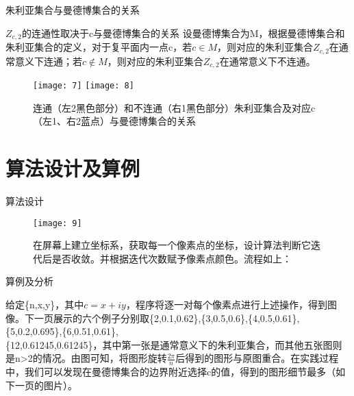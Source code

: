 \documentclass[serif]{beamer}
\begin{document}
\begin{frame}{朱利亚集合与曼德博集合的关系}

\begin{block}{$Z_{c,2}$的连通性取决于c与曼德博集合的关系}
设曼德博集合为M，根据曼德博集合和朱利亚集合的定义，对于复平面内一点c，若$c\in M$，则对应的朱利亚集合$Z_{c,2}$在通常意义下连通；若$c\notin M$，则对应的朱利亚集合$Z_{c,2}$在通常意义下不连通。\cite{TheJuliaSet}

\begin{figure}
\texttt{[image: 7]}
\texttt{[image: 8]}
\caption{连通（左2黑色部分）和不连通（右1黑色部分）朱利亚集合及对应c（左1、右2蓝点）与曼德博集合的关系}
\end{figure}

\end{block}



\end{frame}


\section{算法设计及算例}


\begin{frame}{算法设计}

\begin{figure}
\texttt{[image: 9]}

\caption{在屏幕上建立坐标系，获取每一个像素点的坐标，设计算法判断它迭代后是否收敛。并根据迭代次数赋予像素点颜色。流程如上：}
\end{figure}

\end{frame}

\begin{frame}{算例及分析}

给定\{n,x,y\}，其中$c=x+iy$，程序将逐一对每个像素点进行上述操作，得到图像。下一页展示的六个例子分别取\{2,0.1,0.62\},\{3,0.5,0.6\},\{4,0.5,0.61\},\{5,0.2,0.695\},\{6,0.51,0.61\},\\\{12,0.61245,0.61245\}，其中第一张是通常意义下的朱利亚集合，而其他五张图则是n>2的情况。由图可知，将图形旋转$\frac{2\pi}{n}$后得到的图形与原图重合。在实践过程中，我们可以发现在曼德博集合的边界附近选择c的值，得到的图形细节最多（如下一页的图片）。

\end{frame}
\end{document}
